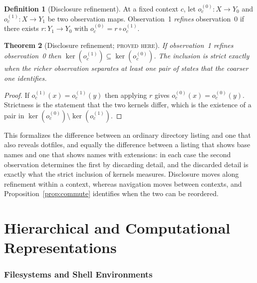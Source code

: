 \documentclass[11pt]{article}
\newtheorem{theorem}{Theorem}[section]
\theoremstyle{definition}
\newtheorem{definition}[theorem]{Definition}
\theoremstyle{remark}
\newcommand{\stN}{\textsc{proved here}}
\begin{document}
\begin{definition}[Disclosure refinement]\label{def:disclosure}
At a fixed context $c$, let $o_c^{(0)}:X\to Y_0$ and $o_c^{(1)}:X\to Y_1$ be two observation maps. Observation~1 \emph{refines} observation~0 if there exists $r:Y_1\to Y_0$ with $o_c^{(0)}=r\circ o_c^{(1)}$.
\end{definition}

\begin{theorem}[Disclosure refinement; \stN]\label{thm:disclosure}
If observation~1 refines observation~0 then $\ker(o_c^{(1)})\subseteq\ker(o_c^{(0)})$. The inclusion is strict exactly when the richer observation separates at least one pair of states that the coarser one identifies.
\end{theorem}
\begin{proof}
If $o_c^{(1)}(x)=o_c^{(1)}(y)$ then applying $r$ gives $o_c^{(0)}(x)=o_c^{(0)}(y)$. Strictness is the statement that the two kernels differ, which is the existence of a pair in $\ker(o_c^{(0)})\setminus\ker(o_c^{(1)})$.
\end{proof}

This formalizes the difference between an ordinary directory listing and one that also reveals dotfiles, and equally the difference between a listing that shows base names and one that shows names with extensions: in each case the second observation determines the first by discarding detail, and the discarded detail is exactly what the strict inclusion of kernels measures. Disclosure moves along refinement within a context, whereas navigation moves between contexts, and Proposition~\ref{prop:commute} identifies when the two can be reordered.
\part{Hierarchical and Computational Representations}

\section{Filesystems and Shell Environments}
\end{document}

